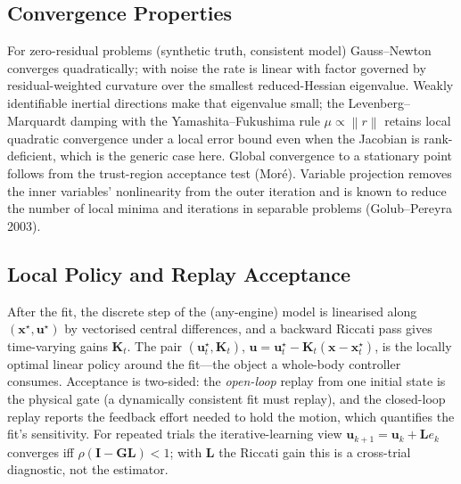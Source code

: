 \documentclass[11pt,a4paper]{article}
\newcommand{\bu}{\mathbf{u}}
\newcommand{\bx}{\mathbf{x}}
\newcommand{\bK}{\mathbf{K}}
\newcommand{\norm}[1]{\left\lVert #1 \right\rVert}
\begin{document}
\subsection{Convergence Properties}
For zero-residual problems (synthetic truth, consistent model) Gauss--Newton
converges quadratically; with noise the rate is linear with factor governed by
residual-weighted curvature over the smallest reduced-Hessian eigenvalue.
Weakly identifiable inertial directions make that eigenvalue small; the
Levenberg--Marquardt damping with the Yamashita--Fukushima rule
$\mu\propto\norm{r}$ retains local quadratic convergence under a local error
bound even when the Jacobian is rank-deficient, which is the generic case
here.  Global convergence to a stationary point follows from the trust-region
acceptance test (Mor\'e).  Variable projection removes the inner variables'
nonlinearity from the outer iteration and is known to reduce the number of
local minima and iterations in separable problems (Golub--Pereyra 2003).

\subsection{Local Policy and Replay Acceptance}
After the fit, the discrete step of the (any-engine) model is linearised along
$(\bx^\star,\bu^\star)$ by vectorised central differences, and a backward
Riccati pass gives time-varying gains $\bK_t$.  The pair $(\bu^\star_t,\bK_t)$,
$\bu=\bu^\star_t-\bK_t(\bx-\bx^\star_t)$, is the locally optimal linear policy
around the fit---the object a whole-body controller consumes.  Acceptance is
two-sided: the \emph{open-loop} replay from one initial state is the physical
gate (a dynamically consistent fit must replay), and the closed-loop replay
reports the feedback effort needed to hold the motion, which quantifies the
fit's sensitivity.  For repeated trials the iterative-learning view
$\bu_{k+1}=\bu_k+\mathbf{L}e_k$ converges iff $\rho(\mathbf{I}-\mathbf{G}\mathbf{L})<1$;
with $\mathbf{L}$ the Riccati gain this is a cross-trial diagnostic, not the
estimator.
\end{document}
